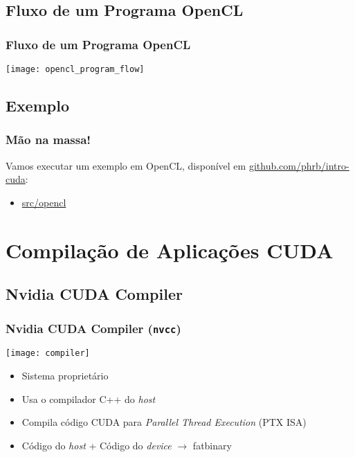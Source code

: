 \documentclass[10pt, compress, aspectratio=43, xcolor={table,usenames,dvipsnames}]{beamer}
\begin{document}
\subsection{Fluxo de um Programa OpenCL}

\begin{frame}
    \frametitle{Fluxo de um Programa OpenCL}
    \begin{center}
        \texttt{[image: opencl\_program\_flow]}
    \end{center}
\end{frame}

\subsection{Exemplo}

\begin{frame}
    \frametitle{Mão na massa!}
    Vamos executar um exemplo em OpenCL,
    disponível em \url{github.com/phrb/intro-cuda}:
    \begin{itemize}
        \item \url{src/opencl}
    \end{itemize}
\end{frame}

\section{Compilação de Aplicações CUDA}

\subsection{Nvidia CUDA Compiler}

\begin{frame}
    \frametitle{Nvidia CUDA Compiler (\texttt{nvcc})}
    \begin{center}
        \texttt{[image: compiler]}
    \end{center}
    \begin{itemize}
        \item Sistema \alert{proprietário}
        \item Usa o compilador C++ do \textit{host}
        \item Compila código CUDA para \textit{Parallel Thread Execution} (\alert{PTX} ISA)
        \item Código do \textit{host} + Código do \textit{device} $\rightarrow$ \alert{fatbinary}
    \end{itemize}
\end{frame}
\end{document}
